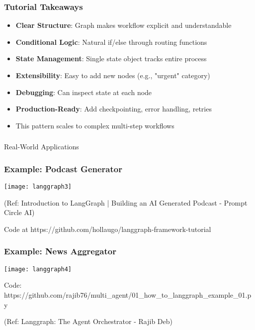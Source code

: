 \begin{frame}[fragile]\frametitle{Tutorial Takeaways}
      \begin{itemize}
        \item \textbf{Clear Structure}: Graph makes workflow explicit and understandable
        \item \textbf{Conditional Logic}: Natural if/else through routing functions
        \item \textbf{State Management}: Single state object tracks entire process
        \item \textbf{Extensibility}: Easy to add new nodes (e.g., "urgent" category)
        \item \textbf{Debugging}: Can inspect state at each node
        \item \textbf{Production-Ready}: Add checkpointing, error handling, retries
        \item This pattern scales to complex multi-step workflows
      \end{itemize}
\end{frame}

\begin{frame}[fragile]\frametitle{}
\begin{center}
{\Large Real-World Applications}
\end{center}
\end{frame}

\begin{frame}\frametitle{Example: Podcast Generator}
\begin{center}
\texttt{[image: langgraph3]}
\end{center}	  
{\tiny (Ref: Introduction to LangGraph | Building an AI Generated Podcast - Prompt Circle AI)}

Code at https://github.com/hollaugo/langgraph-framework-tutorial
\end{frame}

\begin{frame}[fragile]\frametitle{Example: News Aggregator}
\begin{center}
\texttt{[image: langgraph4]}
\end{center}	

Code: https://github.com/rajib76/multi\_agent/01\_how\_to\_langgraph\_example\_01.py

{\tiny (Ref: Langgraph: The Agent Orchestrator - Rajib Deb)}
\end{frame}

